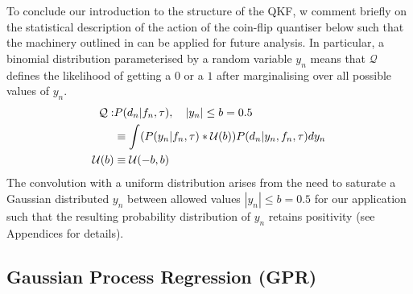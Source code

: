 \documentclass[pra, reprint]{revtex4-1}
\begin{document}
To conclude our introduction to the structure of the QKF, w comment briefly on the statistical description of the action of the coin-flip quantiser below such that the machinery outlined in \cite{karlsson2005} can be applied for future analysis. In particular, a binomial distribution parameterised by a random variable $y_n$ means that $\mathcal{Q}$ defines the likelihood of getting a $0$ or a $1$ after marginalising over all possible values of $y_n$.  
\begin{align}
\mathcal{Q}: & P(d_n | f_{n}, \tau), \quad |y_n| \leq b = 0.5\\
& \equiv  \int (P(y_n | f_{n}, \tau) * \mathcal{U}(b) ) P(d_n | y_n, f_{n}, \tau) dy_n \\
\mathcal{U}(b) & \equiv \mathcal{U}(-b, b)
\end{align}
The convolution with a uniform distribution arises from the need to saturate a Gaussian distributed  $y_n$ between allowed values $|y_n| \leq b = 0.5$ for our application such that the resulting probability distribution of $y_n$ retains positivity (see Appendices for details). 





\subsection{Gaussian Process Regression (GPR)}
\end{document}
